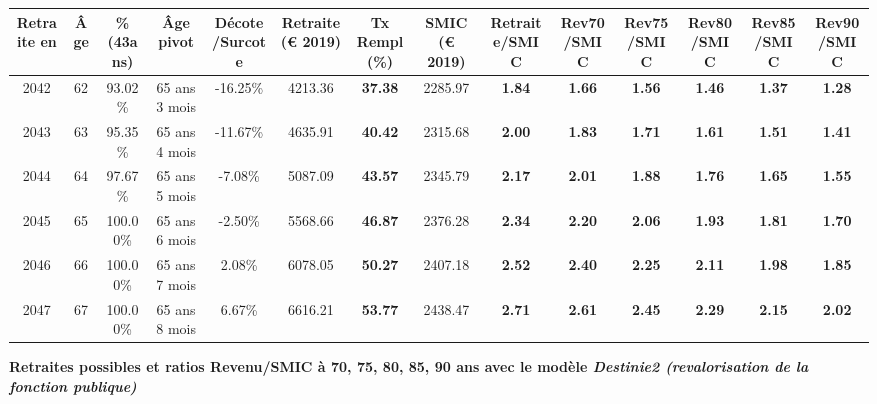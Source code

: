 \begin{adjustbox}{max width=\textwidth} 
\begin{tabular}[htb]{|c|c||c|c|c||c|c||c||c|c|c|c|c|c|} 
\hline 
 Retraite en &  Âge &  \%(43ans) &  Âge pivot &  Décote/Surcote &  Retraite (\euro{} 2019) &  Tx Rempl(\%) &  SMIC (\euro{} 2019) &  Retraite/SMIC &  Rev70/SMIC &  Rev75/SMIC &  Rev80/SMIC &  Rev85/SMIC &  Rev90/SMIC \\ 
\hline \hline 
 2042 &  62 &  93.02\% &  65 ans 3 mois &  -16.25\% &  4213.36 &  {\bf 37.38} &  2285.97 &  {\bf 1.84} &  {\bf 1.66} &  {\bf 1.56} &  {\bf 1.46} &  {\bf 1.37} &  {\bf 1.28} \\ 
\hline 
 2043 &  63 &  95.35\% &  65 ans 4 mois &  -11.67\% &  4635.91 &  {\bf 40.42} &  2315.68 &  {\bf 2.00} &  {\bf 1.83} &  {\bf 1.71} &  {\bf 1.61} &  {\bf 1.51} &  {\bf 1.41} \\ 
\hline 
 2044 &  64 &  97.67\% &  65 ans 5 mois &  -7.08\% &  5087.09 &  {\bf 43.57} &  2345.79 &  {\bf 2.17} &  {\bf 2.01} &  {\bf 1.88} &  {\bf 1.76} &  {\bf 1.65} &  {\bf 1.55} \\ 
\hline 
 2045 &  65 &  100.00\% &  65 ans 6 mois &  -2.50\% &  5568.66 &  {\bf 46.87} &  2376.28 &  {\bf 2.34} &  {\bf 2.20} &  {\bf 2.06} &  {\bf 1.93} &  {\bf 1.81} &  {\bf 1.70} \\ 
\hline 
 2046 &  66 &  100.00\% &  65 ans 7 mois &  2.08\% &  6078.05 &  {\bf 50.27} &  2407.18 &  {\bf 2.52} &  {\bf 2.40} &  {\bf 2.25} &  {\bf 2.11} &  {\bf 1.98} &  {\bf 1.85} \\ 
\hline 
 2047 &  67 &  100.00\% &  65 ans 8 mois &  6.67\% &  6616.21 &  {\bf 53.77} &  2438.47 &  {\bf 2.71} &  {\bf 2.61} &  {\bf 2.45} &  {\bf 2.29} &  {\bf 2.15} &  {\bf 2.02} \\ 
\hline 
\hline 
\end{tabular} 
\end{adjustbox} 
 
 \vspace{0.1cm} 
{\bf \noindent Retraites possibles et ratios Revenu/SMIC à 70, 75, 80, 85, 90 ans avec le modèle \emph{Destinie2 (revalorisation de la fonction publique)}}  
 
